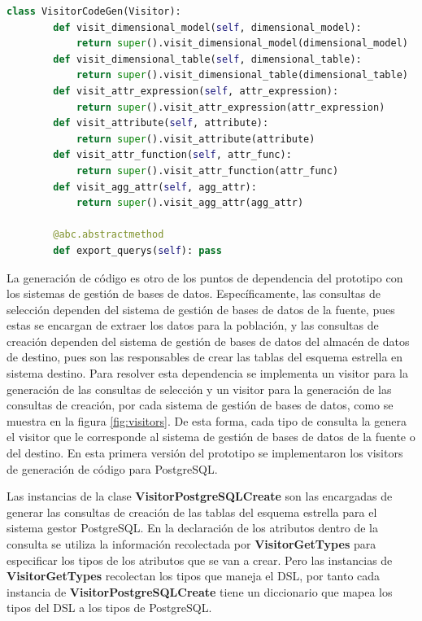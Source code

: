 \begin{lstlisting}[label={code:vcodegen}, caption={Clase VisitorCodeGen}, language={python}]
    class VisitorCodeGen(Visitor):
        def visit_dimensional_model(self, dimensional_model):
            return super().visit_dimensional_model(dimensional_model)
        def visit_dimensional_table(self, dimensional_table):
            return super().visit_dimensional_table(dimensional_table)
        def visit_attr_expression(self, attr_expression):
            return super().visit_attr_expression(attr_expression)
        def visit_attribute(self, attribute):
            return super().visit_attribute(attribute)
        def visit_attr_function(self, attr_func):
            return super().visit_attr_function(attr_func)
        def visit_agg_attr(self, agg_attr):
            return super().visit_agg_attr(agg_attr)

        @abc.abstractmethod
        def export_querys(self): pass
\end{lstlisting}

La generación de código es otro de los puntos de dependencia del prototipo con los sistemas de gestión 
de bases de datos. Específicamente, las consultas de selección dependen del sistema de gestión de bases 
de datos de la fuente, pues estas se encargan de extraer los datos para la población, y las consultas 
de creación dependen del sistema de gestión de bases de datos del almacén de datos de destino, pues 
son las responsables de crear las tablas del esquema estrella en sistema destino. Para resolver esta dependencia 
se implementa un visitor para la generación de las consultas de selección y un visitor para la generación 
de las consultas de creación, por cada sistema de gestión de bases de datos, como se muestra en la 
figura \ref{fig:visitors}. De esta forma, cada tipo de consulta la genera el visitor que le corresponde 
al sistema de gestión de bases de datos de la fuente o del destino. En esta primera versión del prototipo 
se implementaron los visitors de generación de código para PostgreSQL.

Las instancias de la clase \textbf{VisitorPostgreSQLCreate} son las encargadas de generar las 
consultas de creación de las tablas del esquema estrella para el sistema gestor PostgreSQL. En la 
declaración de los atributos 
dentro de la consulta se utiliza la información recolectada por \textbf{VisitorGetTypes} para 
especificar los tipos de los atributos que se van a crear. Pero las instancias de \textbf{VisitorGetTypes} 
recolectan los tipos que maneja el DSL, por tanto cada instancia de \textbf{VisitorPostgreSQLCreate} 
tiene un diccionario que mapea los tipos del DSL a los tipos de PostgreSQL.

